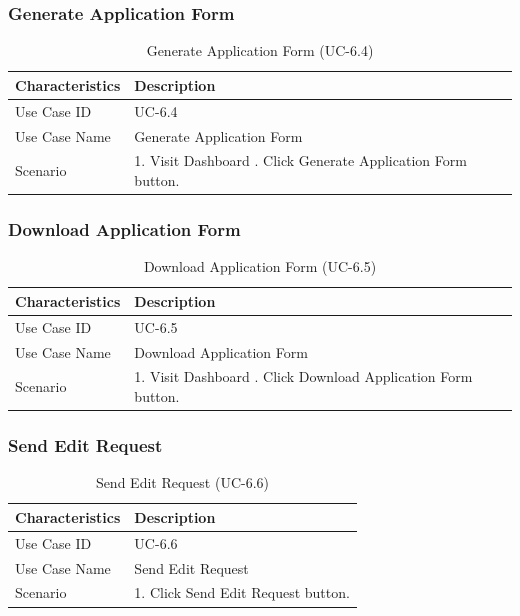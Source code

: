 \subsubsection{Generate Application Form}
\begin{table}[!htbp]
    \centering
    \small
    \renewcommand{\arraystretch}{1.4}
    \caption{Generate Application Form (UC-6.4)}
    \label{tab:generate_application_form}
    \begin{tabularx}{\textwidth}{|l|X|}
        \hline
        \rowcolor[gray]{0.9} {Characteristics} & {Description} \\ \hline
        Use Case ID & UC-6.4 \\ \hline
        Use Case Name & Generate Application Form \\ \hline
        Scenario & 1. Visit Dashboard \newline 2. Click Generate Application Form button. \\ \hline
    \end{tabularx}
\end{table}

\subsubsection{Download Application Form}
\begin{table}[!htbp]
    \centering
    \small
    \renewcommand{\arraystretch}{1.4}
    \caption{Download Application Form (UC-6.5)}
    \label{tab:download_application_form}
    \begin{tabularx}{\textwidth}{|l|X|}
        \hline
        \rowcolor[gray]{0.9} {Characteristics} & {Description} \\ \hline
        Use Case ID & UC-6.5 \\ \hline
        Use Case Name & Download Application Form \\ \hline
        Scenario & 1. Visit Dashboard \newline 2. Click Download Application Form button. \\ \hline
    \end{tabularx}
\end{table}

\subsubsection{Send Edit Request}
\begin{table}[!htbp]
    \centering
    \small
    \renewcommand{\arraystretch}{1.4}
    \caption{Send Edit Request (UC-6.6)}
    \label{tab:send_edit_request}
    \begin{tabularx}{\textwidth}{|l|X|}
        \hline
        \rowcolor[gray]{0.9} {Characteristics} & {Description} \\ \hline
        Use Case ID & UC-6.6 \\ \hline
        Use Case Name & Send Edit Request \\ \hline
        Scenario & 1. Click Send Edit Request button. \\ \hline
    \end{tabularx}
\end{table}

